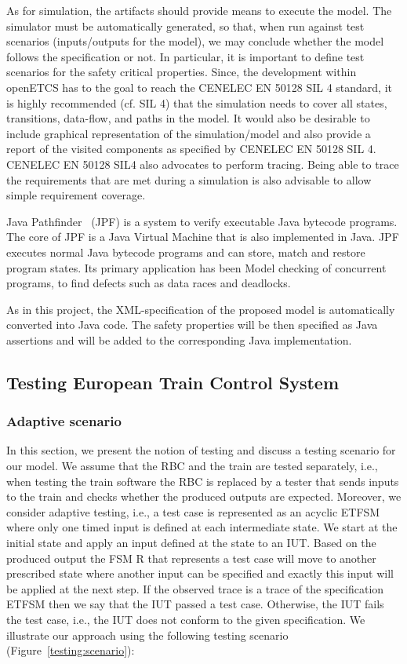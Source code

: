 \documentclass{template/openetcs_article}
\begin{document}
As for simulation, the artifacts should provide means to execute the model.  The simulator must be automatically generated, so that, when run against test scenarios (inputs/outputs for the model), we may conclude whether the model follows the specification or not. In particular, it is important to define test scenarios for the safety critical properties. Since, the development within openETCS has to the goal to reach the CENELEC EN 50128 SIL 4 standard, it is highly recommended (cf. SIL 4) that the simulation needs to cover all states, transitions, data-flow, and paths in the model. It would also be desirable to include graphical representation of the simulation/model and also provide a report of the visited components as specified by CENELEC EN 50128 SIL 4. CENELEC EN 50128 SIL4 also advocates to perform tracing. Being able to trace the requirements that are met during a simulation is also advisable to allow simple requirement coverage.


Java Pathfinder~\cite{JPF} (JPF) is a system to verify executable Java bytecode programs. The core of JPF is a Java Virtual Machine that is also implemented in Java. JPF executes normal Java bytecode programs and can store, match and restore program states. Its primary application has been Model checking of concurrent programs, to find defects such as data races and deadlocks. 

As in this project, the XML-specification of the proposed model is automatically converted into Java code. The safety properties will be then specified as Java assertions and will be added to the corresponding Java implementation. 


\subsection{Testing European Train Control System}
\label{sec:test}

\subsubsection{Adaptive scenario} 

In this section, we present the notion of testing and discuss a testing scenario for our model. We assume that the RBC and the train are tested separately, i.e., when testing the train software the RBC is replaced by a tester that sends inputs to the train and checks whether the produced outputs are expected. Moreover, we consider adaptive testing, i.e., a test case is represented as an acyclic ETFSM~\cite{Petrenko2011,offutt1989coupling} where only one timed input is defined at each intermediate state. We start at the initial state and apply an input defined at the state to an IUT. Based on the produced output the FSM R that represents a test case will move to another prescribed state where another input can be specified and exactly this input will be applied at the next step.  If the observed trace is a trace of the specification ETFSM then we say that the IUT passed a test case. Otherwise, the IUT fails the test case, i.e., the IUT does not conform to the given specification. We illustrate our approach using the following testing scenario (Figure~\ref{testing:scenario}):
\end{document}
